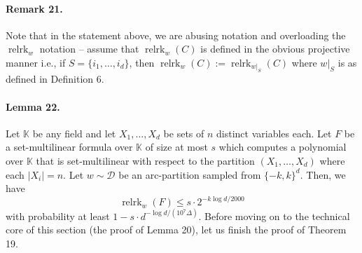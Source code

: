 \documentclass[10pt,a4paper]{article}
\begin{document}
\paragraph{Remark 21.} Note that in the statement above, we are abusing notation and overloading the $\operatorname{relrk}_w$ notation -- assume that $\operatorname{relrk}_w(C)$ is defined in the obvious projective manner i.e., if $S=\{i_1,\ldots,i_d\}$, then $\operatorname{relrk}_w(C):=\operatorname{relrk}_{w|_S}(C)$ where $w|_S$ is as defined in Definition 6.
\paragraph{Lemma 22.} Let $\mathbb K$ be any field and let $X_1,\ldots,X_d$ be sets of $n$ distinct variables each. Let $F$ be a set-multilinear formula over $\mathbb K$ of size at most $s$ which computes a polynomial over $\mathbb K$ that is set-multilinear with respect to the partition $(X_1,\ldots,X_d)$ where each $|X_i|=n$. Let $w\sim\mathcal D$ be an arc-partition sampled from $\{-k,k\}^d$. Then, we have
\[\operatorname{relrk}_w(F)\leq s\cdot2^{-k\log d/2000}\]
with probability at least $1-s\cdot d^{-\log d/(10^7\Delta)}$.
Before moving on to the technical core of this section (the proof of Lemma 20), let us finish the proof of Theorem 19.
\end{document}
